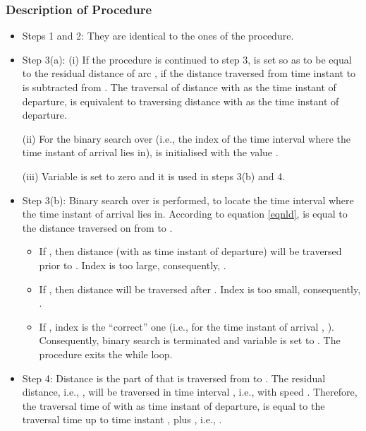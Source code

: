 \documentclass[conference]{IEEEtran}
\begin{document}
\subsubsection{Description of  Procedure}

\begin{itemize}
    \item Steps 1 and 2: They are identical to the ones of the  procedure.
    
    \item Step 3(a): (i) If the procedure is continued to step 3,  is set so as to be equal to the residual distance of arc , if the distance traversed from time instant  to  is subtracted from . The traversal of distance  with  as the time instant of departure, is equivalent to traversing distance  with  as the time instant of departure. 
    
    (ii) For the binary search over  (i.e., the index of the time interval  where the time instant of arrival lies in),  is initialised with the value . 
    
    (iii) Variable  is set to zero and it is used in steps 3(b) and 4.
    
    \item Step 3(b): Binary search over  is performed, to locate the time interval  where the time instant of arrival lies in. According to equation \ref{eqnld},  is equal to the distance traversed on  from  to . 
    
    \begin{itemize}
        \item If , then distance  (with  as time instant of departure) will be traversed prior to . Index  is too large, consequently, .  
        \item If , then distance  will be traversed after . Index  is too small, consequently,  . 
        \item If , index  is the ``correct'' one (i.e., for the time instant of arrival , ). Consequently, binary search is terminated and variable  is set to . The procedure exits the while loop. 
    \end{itemize}
    \item Step 4: Distance  is the part of  that is traversed from  to . The residual distance, i.e., , will be traversed in time interval , i.e., with speed . Therefore, the traversal time of  with  as time instant of departure, is equal to the traversal time up to time instant ,  plus , i.e., .
\end{itemize}
\end{document}
